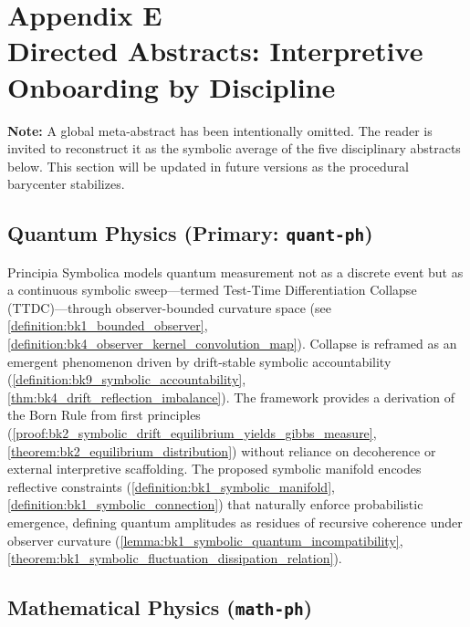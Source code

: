 \chapter*{Appendix E \\ Directed Abstracts: Interpretive Onboarding by Discipline}

\noindent
\textbf{Note:} A global meta-abstract has been intentionally omitted. The reader is invited to reconstruct it as the symbolic average of the five disciplinary abstracts below. This section will be updated in future versions as the procedural barycenter stabilizes.

\section*{Quantum Physics (Primary: \texttt{quant-ph})}
Principia Symbolica models quantum measurement not as a discrete event but as a continuous symbolic sweep—termed Test-Time Differentiation Collapse (TTDC)—through observer-bounded curvature space (see \ref{definition:bk1_bounded_observer}, \ref{definition:bk4_observer_kernel_convolution_map}). Collapse is reframed as an emergent phenomenon driven by drift-stable symbolic accountability (\ref{definition:bk9_symbolic_accountability}, \ref{thm:bk4_drift_reflection_imbalance}). The framework provides a derivation of the Born Rule from first principles (\ref{proof:bk2_symbolic_drift_equilibrium_yields_gibbs_measure}, \ref{theorem:bk2_equilibrium_distribution}) without reliance on decoherence or external interpretive scaffolding. The proposed symbolic manifold encodes reflective constraints (\ref{definition:bk1_symbolic_manifold}, \ref{definition:bk1_symbolic_connection}) that naturally enforce probabilistic emergence, defining quantum amplitudes as residues of recursive coherence under observer curvature (\ref{lemma:bk1_symbolic_quantum_incompatibility}, \ref{theorem:bk1_symbolic_fluctuation_dissipation_relation}).

\section*{Mathematical Physics (\texttt{math-ph})}
\label{abs:mathphys}

